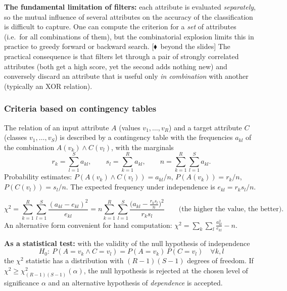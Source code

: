 \documentclass[11pt,a4paper]{article}
\theoremstyle{definition}
\newcommand{\mimo}{\textcolor{markcol}{\textsf{\footnotesize[$\blacklozenge$~beyond the slides]}}}
\begin{document}
\textbf{The fundamental limitation of filters:} each attribute is evaluated \emph{separately},
so the mutual influence of several attributes on the accuracy of the classification is difficult
to capture. One can compute the criterion for a \emph{set} of attributes (i.e.\ for all
combinations of them), but the combinatorial explosion limits this in practice to greedy forward
or backward search. \mimo{} The practical consequence is that filters let through a pair of
strongly correlated attributes (both get a high score, yet the second adds nothing new) and
conversely discard an attribute that is useful only \emph{in combination} with another
(typically an XOR relation).

\subsubsection{Criteria based on contingency tables}

The relation of an input attribute $A$ (values $v_1,\dots,v_R$) and a target attribute $C$
(classes $v_1,\dots,v_S$) is described by a contingency table with the frequencies $a_{kl}$ of
the combination $A(v_k)\wedge C(v_l)$, with the marginals
\[ r_k=\sum_{l=1}^{S}a_{kl},\qquad s_l=\sum_{k=1}^{R}a_{kl},\qquad
n=\sum_{k=1}^{R}\sum_{l=1}^{S}a_{kl}. \]
Probability estimates: $P(A(v_k)\wedge C(v_l))=a_{kl}/n$, $P(A(v_k))=r_k/n$,
$P(C(v_l))=s_l/n$. The expected frequency under independence is $e_{kl}=r_k s_l/n$.

\begin{defbox}
\[ \chi^2=\sum_{k=1}^{R}\sum_{l=1}^{S}\frac{(a_{kl}-e_{kl})^2}{e_{kl}}
   = n\sum_{k=1}^{R}\sum_{l=1}^{S}\frac{\big(a_{kl}-\tfrac{r_ks_l}{n}\big)^2}{r_ks_l}
   \qquad\text{(the higher the value, the better).}\]
An alternative form convenient for hand computation:
$\chi^2=\sum_k\sum_l \frac{a_{kl}^2}{e_{kl}}-n$.

\textbf{As a statistical test:} with the validity of the null hypothesis of independence
\[ H_0:\ P(A=v_k\wedge C=v_l)=P(A=v_k)\,P(C=v_l)\quad \forall k,l \]
the $\chi^2$ statistic has a distribution with $(R-1)(S-1)$ degrees of freedom. If
$\chi^2\ge\chi^2_{(R-1)(S-1)}(\alpha)$, the null hypothesis is rejected at the chosen level of
significance $\alpha$ and an alternative hypothesis of \emph{dependence} is accepted.
\end{defbox}
\end{document}
